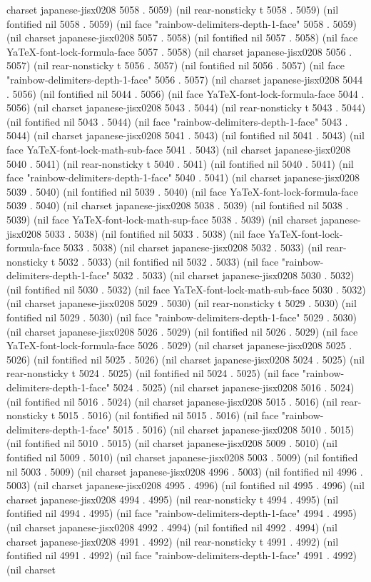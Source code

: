 charset japanese-jisx0208 5058 . 5059) (nil rear-nonsticky t 5058 . 5059) (nil fontified nil 5058 . 5059) (nil face "rainbow-delimiters-depth-1-face" 5058 . 5059) (nil charset japanese-jisx0208 5057 . 5058) (nil fontified nil 5057 . 5058) (nil face YaTeX-font-lock-formula-face 5057 . 5058) (nil charset japanese-jisx0208 5056 . 5057) (nil rear-nonsticky t 5056 . 5057) (nil fontified nil 5056 . 5057) (nil face "rainbow-delimiters-depth-1-face" 5056 . 5057) (nil charset japanese-jisx0208 5044 . 5056) (nil fontified nil 5044 . 5056) (nil face YaTeX-font-lock-formula-face 5044 . 5056) (nil charset japanese-jisx0208 5043 . 5044) (nil rear-nonsticky t 5043 . 5044) (nil fontified nil 5043 . 5044) (nil face "rainbow-delimiters-depth-1-face" 5043 . 5044) (nil charset japanese-jisx0208 5041 . 5043) (nil fontified nil 5041 . 5043) (nil face YaTeX-font-lock-math-sub-face 5041 . 5043) (nil charset japanese-jisx0208 5040 . 5041) (nil rear-nonsticky t 5040 . 5041) (nil fontified nil 5040 . 5041) (nil face "rainbow-delimiters-depth-1-face" 5040 . 5041) (nil charset japanese-jisx0208 5039 . 5040) (nil fontified nil 5039 . 5040) (nil face YaTeX-font-lock-formula-face 5039 . 5040) (nil charset japanese-jisx0208 5038 . 5039) (nil fontified nil 5038 . 5039) (nil face YaTeX-font-lock-math-sup-face 5038 . 5039) (nil charset japanese-jisx0208 5033 . 5038) (nil fontified nil 5033 . 5038) (nil face YaTeX-font-lock-formula-face 5033 . 5038) (nil charset japanese-jisx0208 5032 . 5033) (nil rear-nonsticky t 5032 . 5033) (nil fontified nil 5032 . 5033) (nil face "rainbow-delimiters-depth-1-face" 5032 . 5033) (nil charset japanese-jisx0208 5030 . 5032) (nil fontified nil 5030 . 5032) (nil face YaTeX-font-lock-math-sub-face 5030 . 5032) (nil charset japanese-jisx0208 5029 . 5030) (nil rear-nonsticky t 5029 . 5030) (nil fontified nil 5029 . 5030) (nil face "rainbow-delimiters-depth-1-face" 5029 . 5030) (nil charset japanese-jisx0208 5026 . 5029) (nil fontified nil 5026 . 5029) (nil face YaTeX-font-lock-formula-face 5026 . 5029) (nil charset japanese-jisx0208 5025 . 5026) (nil fontified nil 5025 . 5026) (nil charset japanese-jisx0208 5024 . 5025) (nil rear-nonsticky t 5024 . 5025) (nil fontified nil 5024 . 5025) (nil face "rainbow-delimiters-depth-1-face" 5024 . 5025) (nil charset japanese-jisx0208 5016 . 5024) (nil fontified nil 5016 . 5024) (nil charset japanese-jisx0208 5015 . 5016) (nil rear-nonsticky t 5015 . 5016) (nil fontified nil 5015 . 5016) (nil face "rainbow-delimiters-depth-1-face" 5015 . 5016) (nil charset japanese-jisx0208 5010 . 5015) (nil fontified nil 5010 . 5015) (nil charset japanese-jisx0208 5009 . 5010) (nil fontified nil 5009 . 5010) (nil charset japanese-jisx0208 5003 . 5009) (nil fontified nil 5003 . 5009) (nil charset japanese-jisx0208 4996 . 5003) (nil fontified nil 4996 . 5003) (nil charset japanese-jisx0208 4995 . 4996) (nil fontified nil 4995 . 4996) (nil charset japanese-jisx0208 4994 . 4995) (nil rear-nonsticky t 4994 . 4995) (nil fontified nil 4994 . 4995) (nil face "rainbow-delimiters-depth-1-face" 4994 . 4995) (nil charset japanese-jisx0208 4992 . 4994) (nil fontified nil 4992 . 4994) (nil charset japanese-jisx0208 4991 . 4992) (nil rear-nonsticky t 4991 . 4992) (nil fontified nil 4991 . 4992) (nil face "rainbow-delimiters-depth-1-face" 4991 . 4992) (nil charset 